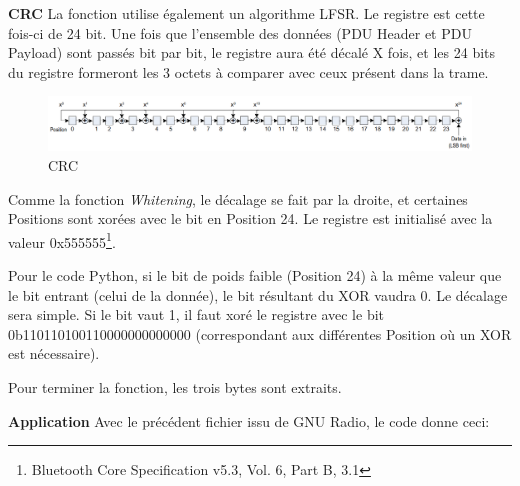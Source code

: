 \textbf{CRC} La fonction utilise également un algorithme LFSR. Le
registre est cette fois-ci de 24 bit. Une fois que l'ensemble des
données (PDU Header et PDU Payload) sont passés bit par bit, le registre
aura été décalé X fois, et les 24 bits du registre formeront les 3
octets à comparer avec ceux présent dans la trame.

\begin{figure}
\centering
\includegraphics{static/CRC.png}
\caption{CRC}
\end{figure}

Comme la fonction \emph{Whitening}, le décalage se fait par la droite,
et certaines Positions sont xorées avec le bit en Position 24. Le
registre est initialisé avec la valeur 0x555555\footnote{Bluetooth Core
  Specification v5.3, Vol. 6, Part B, 3.1}.

Pour le code Python, si le bit de poids faible (Position 24) à la même
valeur que le bit entrant (celui de la donnée), le bit résultant du XOR
vaudra 0. Le décalage sera simple. Si le bit vaut 1, il faut xoré le
registre avec le bit 0b110110100110000000000000 (correspondant aux
différentes Position où un XOR est nécessaire).

Pour terminer la fonction, les trois bytes sont extraits.

\textbf{Application} Avec le précédent fichier issu de GNU Radio, le
code donne ceci:

